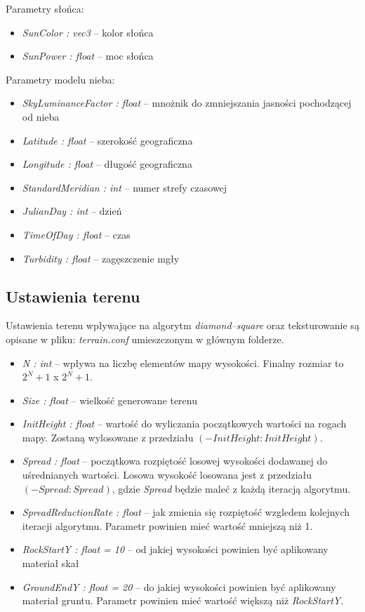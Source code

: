 \documentclass[inz,shortabstract]{iithesis}
\begin{document}
        Parametry słońca:
        \begin{itemize}
            \item \textit{SunColor : vec3} -- kolor słońca 
            \item \textit{SunPower : float} -- moc słońca
        \end{itemize}
        
        Parametry modelu nieba:
        \begin{itemize}
            \item \textit{SkyLuminanceFactor : float} -- mnożnik do zmniejszania jasności pochodzącej od nieba
            \item \textit{Latitude : float} -- szerokość geograficzna
            \item \textit{Longitude : float} -- długość geograficzna
            \item \textit{StandardMeridian : int} -- numer strefy czasowej
            \item \textit{JulianDay : int} -- dzień
            \item \textit{TimeOfDay : float} -- czas
            \item \textit{Turbidity : float} -- zagęszczenie mgły 
        \end{itemize}
        
        \subsection{Ustawienia terenu}
        Ustawienia terenu wpływające na algorytm \textit{diamond--square} oraz teksturowanie są opisane w pliku: \textit{terrain.conf} umieszczonym w głównym folderze.
        
        \begin{itemize}
            \item \textit{N : int} -- wpływa na liczbę elementów mapy wysokości. Finalny rozmiar to $2^N+1$ x $2^N+1$.
            \item \textit{Size : float} -- wielkość generowane terenu 
            \item \textit{InitHeight : float} -- wartość do wyliczania początkowych wartości na rogach mapy. Zostaną wylosowane z przedziału $(-\textit{InitHeight}:\textit{InitHeight})$.
            \item \textit{Spread : float} -- początkowa rozpiętość losowej wysokości dodawanej do uśrednianych wartości. Losowa wysokość losowana jest z przedziału $(-\textit{Spread}:\textit{Spread})$, gdzie \textit{Spread} będzie maleć z każdą iteracją algorytmu.
            \item \textit{SpreadReductionRate : float} -- jak zmienia się rozpiętość wzgledem kolejnych iteracji algorytmu. Parametr powinien mieć wartość mniejszą niż 1. 
            \item \textit{RockStartY : float = 10} -- od jakiej wysokości powinien być aplikowany materiał skał
            \item \textit{GroundEndY : float = 20} -- do jakiej wysokości powinien być aplikowany materiał gruntu. Parametr powinien mieć wartość większą niż \textit{RockStartY}. 
        \end{itemize}
        
\end{document}

